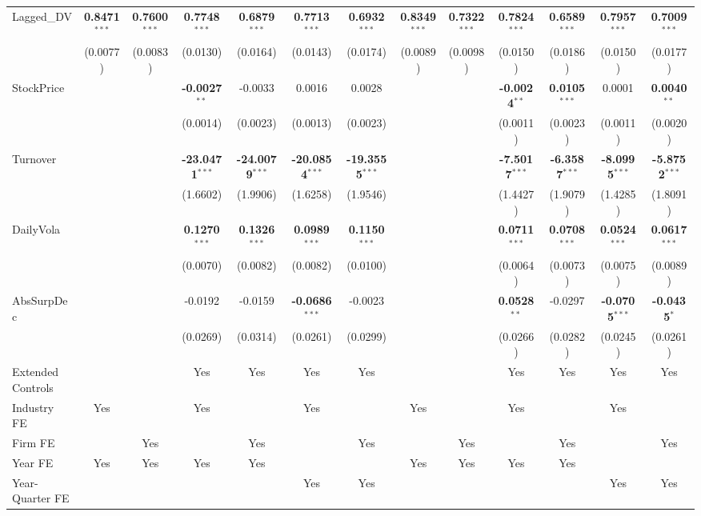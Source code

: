 \documentclass[11pt,a4paper]{article}
\begin{document}
\begin{table}[htbp]
\begin{tabular}{lcccccccccccc}
Lagged\_DV & \textbf{0.8471}$^{***}$ & \textbf{0.7600}$^{***}$ & \textbf{0.7748}$^{***}$ & \textbf{0.6879}$^{***}$ & \textbf{0.7713}$^{***}$ & \textbf{0.6932}$^{***}$ & \textbf{0.8349}$^{***}$ & \textbf{0.7322}$^{***}$ & \textbf{0.7824}$^{***}$ & \textbf{0.6589}$^{***}$ & \textbf{0.7957}$^{***}$ & \textbf{0.7009}$^{***}$ \\
 & (0.0077) & (0.0083) & (0.0130) & (0.0164) & (0.0143) & (0.0174) & (0.0089) & (0.0098) & (0.0150) & (0.0186) & (0.0150) & (0.0177) \\
StockPrice &  &  & \textbf{-0.0027}$^{**}$ & -0.0033 & 0.0016 & 0.0028 &  &  & \textbf{-0.0024}$^{**}$ & \textbf{0.0105}$^{***}$ & 0.0001 & \textbf{0.0040}$^{**}$ \\
 &  &  & (0.0014) & (0.0023) & (0.0013) & (0.0023) &  &  & (0.0011) & (0.0023) & (0.0011) & (0.0020) \\
Turnover &  &  & \textbf{-23.0471}$^{***}$ & \textbf{-24.0079}$^{***}$ & \textbf{-20.0854}$^{***}$ & \textbf{-19.3555}$^{***}$ &  &  & \textbf{-7.5017}$^{***}$ & \textbf{-6.3587}$^{***}$ & \textbf{-8.0995}$^{***}$ & \textbf{-5.8752}$^{***}$ \\
 &  &  & (1.6602) & (1.9906) & (1.6258) & (1.9546) &  &  & (1.4427) & (1.9079) & (1.4285) & (1.8091) \\
DailyVola &  &  & \textbf{0.1270}$^{***}$ & \textbf{0.1326}$^{***}$ & \textbf{0.0989}$^{***}$ & \textbf{0.1150}$^{***}$ &  &  & \textbf{0.0711}$^{***}$ & \textbf{0.0708}$^{***}$ & \textbf{0.0524}$^{***}$ & \textbf{0.0617}$^{***}$ \\
 &  &  & (0.0070) & (0.0082) & (0.0082) & (0.0100) &  &  & (0.0064) & (0.0073) & (0.0075) & (0.0089) \\
AbsSurpDec &  &  & -0.0192 & -0.0159 & \textbf{-0.0686}$^{***}$ & -0.0023 &  &  & \textbf{0.0528}$^{**}$ & -0.0297 & \textbf{-0.0705}$^{***}$ & \textbf{-0.0435}$^{*}$ \\
 &  &  & (0.0269) & (0.0314) & (0.0261) & (0.0299) &  &  & (0.0266) & (0.0282) & (0.0245) & (0.0261) \\
\midrule
Extended Controls &  &  & Yes & Yes & Yes & Yes &  &  & Yes & Yes & Yes & Yes \\
Industry FE & Yes &  & Yes &  & Yes &  & Yes &  & Yes &  & Yes &  \\
Firm FE &  & Yes &  & Yes &  & Yes &  & Yes &  & Yes &  & Yes \\
Year FE & Yes & Yes & Yes & Yes &  &  & Yes & Yes & Yes & Yes &  &  \\
Year-Quarter FE &  &  &  &  & Yes & Yes &  &  &  &  & Yes & Yes \\

\end{tabular}
\end{table}
\end{document}
